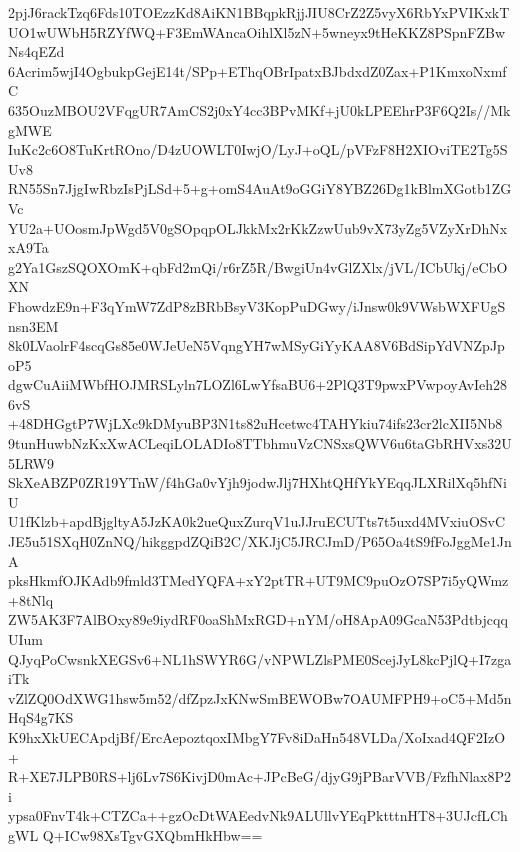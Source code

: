 2pjJ6rackTzq6Fds10TOEzzKd8AiKN1BBqpkRjjJIU8CrZ2Z5vyX6RbYxPVIKxkT
UO1wUWbH5RZYfWQ+F3EmWAncaOihlXl5zN+5wneyx9tHeKKZ8PSpnFZBwNs4qEZd
6Acrim5wjI4OgbukpGejE14t/SPp+EThqOBrIpatxBJbdxdZ0Zax+P1KmxoNxmfC
635OuzMBOU2VFqgUR7AmCS2j0xY4cc3BPvMKf+jU0kLPEEhrP3F6Q2Is//MkgMWE
IuKc2c6O8TuKrtROno/D4zUOWLT0IwjO/LyJ+oQL/pVFzF8H2XIOviTE2Tg5SUv8
RN55Sn7JjgIwRbzIsPjLSd+5+g+omS4AuAt9oGGiY8YBZ26Dg1kBlmXGotb1ZGVc
YU2a+UOosmJpWgd5V0gSOpqpOLJkkMx2rKkZzwUub9vX73yZg5VZyXrDhNxxA9Ta
g2Ya1GszSQOXOmK+qbFd2mQi/r6rZ5R/BwgiUn4vGlZXlx/jVL/ICbUkj/eCbOXN
FhowdzE9n+F3qYmW7ZdP8zBRbBsyV3KopPuDGwy/iJnsw0k9VWsbWXFUgSnsn3EM
8k0LVaolrF4scqGs85e0WJeUeN5VqngYH7wMSyGiYyKAA8V6BdSipYdVNZpJpoP5
dgwCuAiiMWbfHOJMRSLyln7LOZl6LwYfsaBU6+2PlQ3T9pwxPVwpoyAvIeh286vS
+48DHGgtP7WjLXc9kDMyuBP3N1ts82uHcetwc4TAHYkiu74ifs23cr2lcXII5Nb8
9tunHuwbNzKxXwACLeqiLOLADIo8TTbhmuVzCNSxsQWV6u6taGbRHVxs32U5LRW9
SkXeABZP0ZR19YTnW/f4hGa0vYjh9jodwJlj7HXhtQHfYkYEqqJLXRilXq5hfNiU
U1fKlzb+apdBjgltyA5JzKA0k2ueQuxZurqV1uJJruECUTts7t5uxd4MVxiuOSvC
JE5u51SXqH0ZnNQ/hikggpdZQiB2C/XKJjC5JRCJmD/P65Oa4tS9fFoJggMe1JnA
pksHkmfOJKAdb9fmld3TMedYQFA+xY2ptTR+UT9MC9puOzO7SP7i5yQWmz+8tNlq
ZW5AK3F7AlBOxy89e9iydRF0oaShMxRGD+nYM/oH8ApA09GcaN53PdtbjcqqUIum
QJyqPoCwsnkXEGSv6+NL1hSWYR6G/vNPWLZlsPME0ScejJyL8kcPjlQ+I7zgaiTk
vZlZQ0OdXWG1hsw5m52/dfZpzJxKNwSmBEWOBw7OAUMFPH9+oC5+Md5nHqS4g7KS
K9hxXkUECApdjBf/ErcAepoztqoxIMbgY7Fv8iDaHn548VLDa/XoIxad4QF2IzO+
R+XE7JLPB0RS+lj6Lv7S6KivjD0mAc+JPcBeG/djyG9jPBarVVB/FzfhNlax8P2i
ypsa0FnvT4k+CTZCa++gzOcDtWAEedvNk9ALUllvYEqPktttnHT8+3UJcfLChgWL
Q+ICw98XsTgvGXQbmHkHbw==
